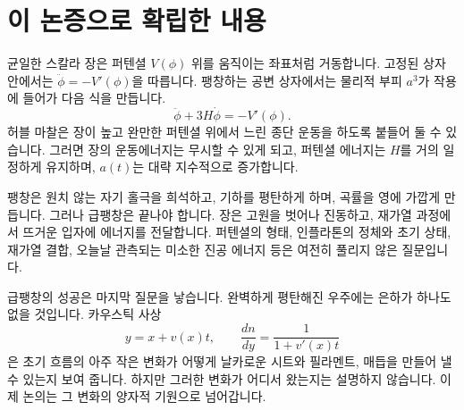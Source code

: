 \section{이 논증으로 확립한 내용}

균일한 스칼라 장은 퍼텐셜 \(V(\phi)\) 위를 움직이는 좌표처럼 거동합니다. 고정된 상자 안에서는 \(\ddot\phi=-V'(\phi)\)을 따릅니다. 팽창하는 공변 상자에서는 물리적 부피 \(a^3\)가 작용에 들어가 다음 식을 만듭니다.
\[
\ddot\phi+3H\dot\phi=-V'(\phi).
\]
허블 마찰은 장이 높고 완만한 퍼텐셜 위에서 느린 종단 운동을 하도록 붙들어 둘 수 있습니다. 그러면 장의 운동에너지는 무시할 수 있게 되고, 퍼텐셜 에너지는 \(H\)를 거의 일정하게 유지하며, \(a(t)\)는 대략 지수적으로 증가합니다.

팽창은 원치 않는 자기 홀극을 희석하고, 기하를 평탄하게 하며, 곡률을 영에 가깝게 만듭니다. 그러나 급팽창은 끝나야 합니다. 장은 고원을 벗어나 진동하고, 재가열 과정에서 뜨거운 입자에 에너지를 전달합니다. 퍼텐셜의 형태, 인플라톤의 정체와 초기 상태, 재가열 결합, 오늘날 관측되는 미소한 진공 에너지 등은 여전히 풀리지 않은 질문입니다.

급팽창의 성공은 마지막 질문을 낳습니다. 완벽하게 평탄해진 우주에는 은하가 하나도 없을 것입니다. 카우스틱 사상
\[
y=x+v(x)t,
\qquad
\frac{dn}{dy}=\frac{1}{1+v'(x)t}
\]
은 초기 흐름의 아주 작은 변화가 어떻게 날카로운 시트와 필라멘트, 매듭을 만들어 낼 수 있는지 보여 줍니다. 하지만 그러한 변화가 어디서 왔는지는 설명하지 않습니다. 이제 논의는 그 변화의 양자적 기원으로 넘어갑니다.
